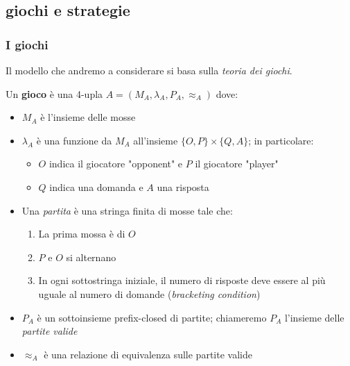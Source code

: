 \documentclass{beamer}
\begin{document}
\subsection{giochi e strategie}

\begin{frame}
	\frametitle{I giochi}
	
	Il modello che andremo a considerare si basa sulla \emph{teoria dei giochi}.
	
	
	Un \textbf{gioco} è una 4-upla $A=( M_A , \lambda_A , P_A , \approx_A )$ dove:
	\begin{itemize}
	\item<2-> $M_A$ è l'insieme delle mosse
	\item<3-> $\lambda_A$ è una funzione da $M_A$ all'insieme $\{ O,P\} \times \{Q,A\}$; in particolare:
		\begin{itemize}
		\item $O$ indica il giocatore "opponent" e $P$ il giocatore "player"
		\item $Q$ indica una domanda e $A$ una risposta
		\end{itemize}
	\item<4-> Una \textit{partita} è una stringa finita di mosse tale che:
		\begin{enumerate}
		\item La prima mossa è di $O$
		\item $P$ e $O$ si alternano
		\item In ogni sottostringa iniziale, il numero di risposte deve essere al più uguale al numero di domande (\emph{bracketing condition})
		\end{enumerate}
	\item<5-> $P_A$ è un sottoinsieme prefix-closed di partite; chiameremo $P_A$ l'insieme delle \textit{partite valide}
	\item<6->  $\approx_A$ è una relazione di equivalenza sulle partite valide
	\end{itemize}
	
	
\end{frame}
\end{document}
